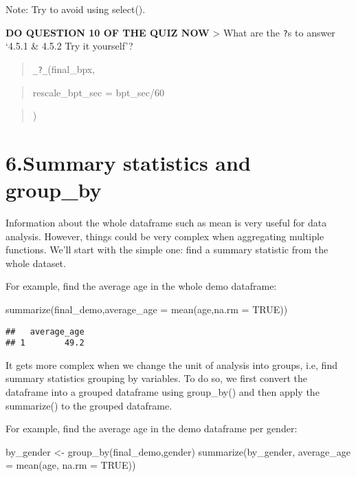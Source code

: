 \documentclass[
]{book}
\newenvironment{Shaded}{\begin{snugshade}}{\end{snugshade}}
\newcommand{\AttributeTok}[1]{\textcolor[rgb]{0.77,0.63,0.00}{#1}}
\newcommand{\ConstantTok}[1]{\textcolor[rgb]{0.00,0.00,0.00}{#1}}
\newcommand{\FunctionTok}[1]{\textcolor[rgb]{0.00,0.00,0.00}{#1}}
\newcommand{\NormalTok}[1]{#1}
\newcommand{\OtherTok}[1]{\textcolor[rgb]{0.56,0.35,0.01}{#1}}
\begin{document}
Note: Try to avoid using select().

\textbf{DO QUESTION 10 OF THE QUIZ NOW}
\textgreater{} What are the \texttt{?}s to answer `4.5.1 \& 4.5.2 Try it yourself'?

\begin{quote}
\texttt{\_?\_}(final\_bpx,
\end{quote}

\begin{quote}
rescale\_bpt\_sec = bpt\_sec/60
\end{quote}

\begin{quote}
)
\end{quote}

\hypertarget{summary-statistics-and-group_by}{%
\section{6.Summary statistics and group\_by}\label{summary-statistics-and-group_by}}

Information about the whole dataframe such as mean is very useful for data analysis. However, things could be very complex when aggregating multiple functions. We'll start with the simple one: find a summary statistic from the whole dataset.

For example, find the average age in the whole demo dataframe:

\begin{Shaded}
\begin{Highlighting}[]
\FunctionTok{summarize}\NormalTok{(final\_demo,}\AttributeTok{average\_age =} \FunctionTok{mean}\NormalTok{(age,}\AttributeTok{na.rm =} \ConstantTok{TRUE}\NormalTok{))}
\end{Highlighting}
\end{Shaded}

\begin{verbatim}
##   average_age
## 1        49.2
\end{verbatim}

It gets more complex when we change the unit of analysis into groups, i.e, find summary statistics grouping by variables. To do so, we first convert the dataframe into a grouped dataframe using group\_by() and then apply the summarize() to the grouped dataframe.

For example, find the average age in the demo dataframe per gender:

\begin{Shaded}
\begin{Highlighting}[]
\NormalTok{by\_gender }\OtherTok{\textless{}{-}} \FunctionTok{group\_by}\NormalTok{(final\_demo,gender)}
\FunctionTok{summarize}\NormalTok{(by\_gender, }\AttributeTok{average\_age =} \FunctionTok{mean}\NormalTok{(age, }\AttributeTok{na.rm =} \ConstantTok{TRUE}\NormalTok{))}
\end{Highlighting}
\end{Shaded}
\end{document}
